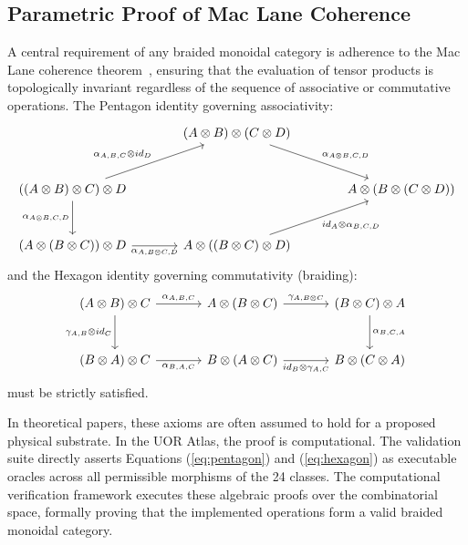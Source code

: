 \subsection{Parametric Proof of Mac Lane Coherence}
A central requirement of any braided monoidal category is adherence to the Mac Lane coherence theorem~\cite{maclane1963}, ensuring that the evaluation of tensor products is topologically invariant regardless of the sequence of associative or commutative operations. The Pentagon identity governing associativity:
\begin{equation}
\label{eq:pentagon}
\begin{tikzcd}[column sep=large, row sep=large]
& (A \otimes B) \otimes (C \otimes D) \arrow[dr, "\alpha_{A\otimes B,C,D}"] & \\
((A \otimes B) \otimes C) \otimes D \arrow[ur, "\alpha_{A,B,C} \otimes id_D"] \arrow[d, "\alpha_{A\otimes B,C,D}"'] & & A \otimes (B \otimes (C \otimes D)) \\
(A \otimes (B \otimes C)) \otimes D \arrow[r, "\alpha_{A,B\otimes C,D}"'] & A \otimes ((B \otimes C) \otimes D) \arrow[ur, "id_A \otimes \alpha_{B,C,D}"'] & 
\end{tikzcd}
\end{equation}
and the Hexagon identity governing commutativity (braiding):
\begin{equation}
\label{eq:hexagon}
\begin{tikzcd}[column sep=large, row sep=large]
(A \otimes B) \otimes C \arrow[r, "\alpha_{A,B,C}"] \arrow[d, "\gamma_{A,B} \otimes id_C"'] & A \otimes (B \otimes C) \arrow[r, "\gamma_{A,B\otimes C}"] & (B \otimes C) \otimes A \arrow[d, "\alpha_{B,C,A}"] \\
(B \otimes A) \otimes C \arrow[r, "\alpha_{B,A,C}"'] & B \otimes (A \otimes C) \arrow[r, "id_B \otimes \gamma_{A,C}"'] & B \otimes (C \otimes A)
\end{tikzcd}
\end{equation}
must be strictly satisfied. 

In theoretical papers, these axioms are often assumed to hold for a proposed physical substrate. In the UOR Atlas, the proof is computational. The validation suite directly asserts Equations (\ref{eq:pentagon}) and (\ref{eq:hexagon}) as executable oracles across all permissible morphisms of the 24 classes. The computational verification framework executes these algebraic proofs over the combinatorial space, formally proving that the implemented operations form a valid braided monoidal category.
